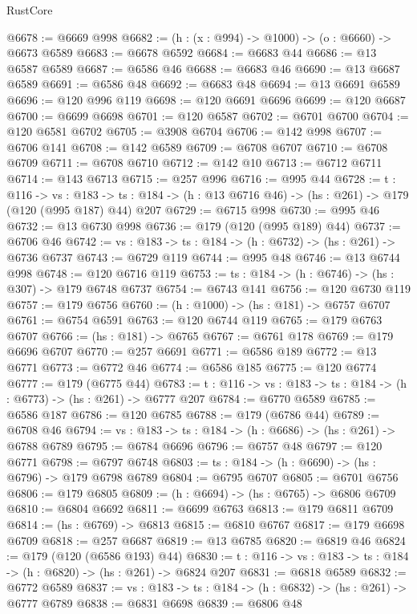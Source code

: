 \begin{lexlean}{RustCore}
\begin{coremodule}
@6678 := @6669 @998
@6682 := (h : (x : @994) -> @1000) -> (o : @6660) -> @6673 @6589
@6683 := @6678 @6592
@6684 := @6683 @44
@6686 := @13 @6587 @6589
@6687 := @6586 @46
@6688 := @6683 @46
@6690 := @13 @6687 @6589
@6691 := @6586 @48
@6692 := @6683 @48
@6694 := @13 @6691 @6589
@6696 := @120 @996 @119
@6698 := @120 @6691 @6696
@6699 := @120 @6687
@6700 := @6699 @6698
@6701 := @120 @6587
@6702 := @6701 @6700
@6704 := @120 @6581 @6702
@6705 := @3908 @6704
@6706 := @142 @998
@6707 := @6706 @141
@6708 := @142 @6589
@6709 := @6708 @6707
@6710 := @6708 @6709
@6711 := @6708 @6710
@6712 := @142 @10
@6713 := @6712 @6711
@6714 := @143 @6713
@6715 := @257 @996
@6716 := @995 @44
@6728 := {t : @116} ->
  {vs : @183} ->
  {ts : @184} -> (h : @13 @6716 @46) -> (hs : @261) -> @179 (@120 (@995 @187) @44) @207
@6729 := @6715 @998
@6730 := @995 @46
@6732 := @13 @6730 @998
@6736 := @179 (@120 (@995 @189) @44)
@6737 := @6706 @46
@6742 := {vs : @183} -> {ts : @184} -> (h : @6732) -> (hs : @261) -> @6736 @6737
@6743 := @6729 @119
@6744 := @995 @48
@6746 := @13 @6744 @998
@6748 := @120 @6716 @119
@6753 := {ts : @184} -> (h : @6746) -> (hs : @307) -> @179 @6748 @6737
@6754 := @6743 @141
@6756 := @120 @6730 @119
@6757 := @179 @6756
@6760 := (h : @1000) -> (hs : @181) -> @6757 @6707
@6761 := @6754 @6591
@6763 := @120 @6744 @119
@6765 := @179 @6763 @6707
@6766 := (hs : @181) -> @6765
@6767 := @6761 @178
@6769 := @179 @6696 @6707
@6770 := @257 @6691
@6771 := @6586 @189
@6772 := @13 @6771
@6773 := @6772 @46
@6774 := @6586 @185
@6775 := @120 @6774
@6777 := @179 (@6775 @44)
@6783 := {t : @116} -> {vs : @183} -> {ts : @184} -> (h : @6773) -> (hs : @261) -> @6777 @207
@6784 := @6770 @6589
@6785 := @6586 @187
@6786 := @120 @6785
@6788 := @179 (@6786 @44)
@6789 := @6708 @46
@6794 := {vs : @183} -> {ts : @184} -> (h : @6686) -> (hs : @261) -> @6788 @6789
@6795 := @6784 @6696
@6796 := @6757 @48
@6797 := @120 @6771
@6798 := @6797 @6748
@6803 := {ts : @184} -> (h : @6690) -> (hs : @6796) -> @179 @6798 @6789
@6804 := @6795 @6707
@6805 := @6701 @6756
@6806 := @179 @6805
@6809 := (h : @6694) -> (hs : @6765) -> @6806 @6709
@6810 := @6804 @6692
@6811 := @6699 @6763
@6813 := @179 @6811 @6709
@6814 := (hs : @6769) -> @6813
@6815 := @6810 @6767
@6817 := @179 @6698 @6709
@6818 := @257 @6687
@6819 := @13 @6785
@6820 := @6819 @46
@6824 := @179 (@120 (@6586 @193) @44)
@6830 := {t : @116} -> {vs : @183} -> {ts : @184} -> (h : @6820) -> (hs : @261) -> @6824 @207
@6831 := @6818 @6589
@6832 := @6772 @6589
@6837 := {vs : @183} -> {ts : @184} -> (h : @6832) -> (hs : @261) -> @6777 @6789
@6838 := @6831 @6698
@6839 := @6806 @48

\end{coremodule}
\end{lexlean}
